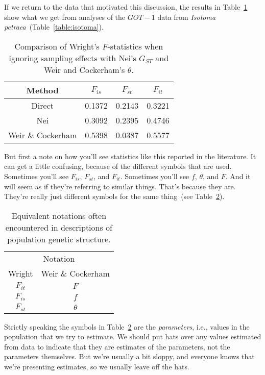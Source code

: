 If we return to the data that motivated this discussion, the results
in Table~\ref{table:fst-comparison} show what we get from analyses of
the $GOT-1$ data from {\it Isotoma
  petraea}~(Table~\ref{table:isotoma}).
\begin{table}
\begin{center}
  \begin{tabular}{c|ccc}
\hline\hline
Method & $F_{is}$ & $F_{st}$ & $F_{it}$ \\
\hline
Direct            & 0.1372 & 0.2143 & 0.3221 \\
Nei               & 0.3092 & 0.2395 & 0.4746 \\
Weir \& Cockerham & 0.5398 & 0.0387 & 0.5577 \\
\hline
\end{tabular}
\end{center}
\caption{Comparison of Wright's $F$-statistics when ignoring sampling
  effects with Nei's $G_{ST}$ and Weir and Cockerham's $\theta$.}\label{table:fst-comparison}
\end{table}
But first a note on how you'll see statistics like this reported in
the literature. It can get a little confusing, because of the
different symbols that are used. Sometimes you'll see $F_{is}$,
$F_{st}$, and $F_{it}$. Sometimes you'll see $f$, $\theta$, and
$F$. And it will seem as if they're referring to similar
things. That's because they are. They're really just different symbols
for the same thing~(see
Table~\ref{table:fst-theta}).
\begin{table}
\begin{center}
\begin{tabular}{cc}
\hline\hline
\multicolumn{2}{c}{Notation} \\
Wright & Weir \& Cockerham \\
\hline
$F_{it}$ & $F$ \\
$F_{is}$ & $f$ \\
$F_{st}$ & $\theta$ \\
\hline
\end{tabular}
\end{center}
\caption{Equivalent notations often encountered in descriptions of
  population genetic structure.}\label{table:fst-theta}
\end{table}
Strictly speaking the symbols in Table~\ref{table:fst-theta} are the
{\it parameters}, i.e., values in the population that we try to
estimate. We should put hats over any values estimated from data to
indicate that they are estimates of the parameters, not the parameters
themselves. But we're usually a bit sloppy, and everyone knows that
we're presenting estimates, so we usually leave off the hats.

